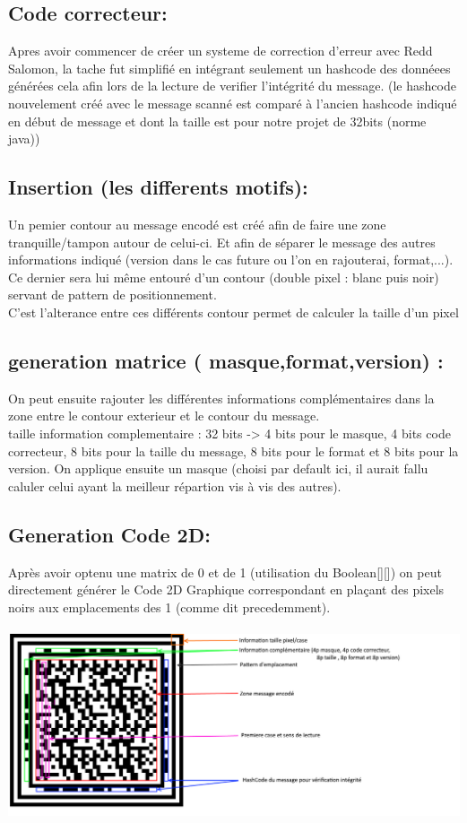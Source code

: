 \documentclass{article}
\begin{document}
\subsection{Code correcteur:}
Apres avoir commencer de créer un systeme de correction d'erreur avec Redd Salomon, la tache fut simplifié en intégrant seulement un hashcode des donnéees générées cela afin lors de la lecture de verifier l'intégrité du message. (le hashcode nouvelement créé avec le message scanné est comparé à l'ancien hashcode indiqué en début de message et dont la taille est pour notre projet de 32bits (norme java))
\\
\subsection{Insertion (les differents motifs):}
Un pemier contour au message encodé est créé afin de faire une zone tranquille/tampon autour de celui-ci. Et afin de séparer le message des autres informations indiqué (version dans le cas future ou l'on en rajouterai, format,...). Ce dernier sera lui même entouré d'un contour (double pixel : blanc puis noir) servant de pattern de positionnement.\\
C'est l'alterance entre ces différents contour permet de calculer la taille d'un pixel
\\
\subsection{ generation matrice ( masque,format,version) :}
On peut ensuite rajouter les différentes informations complémentaires dans la zone entre le contour exterieur et le contour du message.\\
taille information complementaire : 32 bits -> 4 bits pour le masque, 4 bits code correcteur, 8 bits pour la taille du message, 8 bits pour le format et 8 bits pour la version.
On applique ensuite un masque (choisi par default ici, il aurait fallu caluler celui ayant la meilleur répartion vis à vis des autres).
\\
\subsection{Generation Code 2D:}
Après avoir optenu une matrix de 0 et de 1 (utilisation du Boolean[][]) on peut directement générer le Code 2D Graphique correspondant en plaçant des pixels noirs aux emplacements des 1 (comme dit precedemment).
\\\\
\includegraphics[scale=0.5]{schema2.png} 
\\\\
\end{document}
